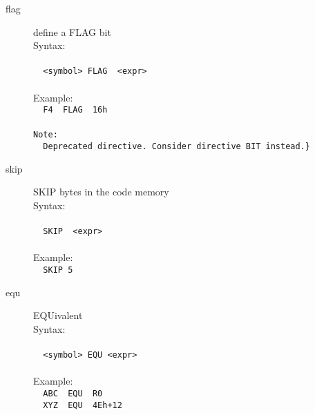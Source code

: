 \documentclass[a4paper,twoside,12pt]{book}
\begin{document}
\begin{description}
			\item[flag] define a FLAG bit\\
				Syntax:\\\\
				\verb'  '{\color{highlight_constant}\verb'<symbol>'}\verb' '{\color{highlight_directive}\verb'FLAG'}\verb'  '{\color{highlight_symbol}\verb'<'}{\color{highlight_constant}\verb'expr'}{\color{highlight_symbol}\verb'>'}\\
				\verb''\\
				Example:\\
				\verb'  '{\color{highlight_constant}\verb'F4'}\verb'  '{\color{highlight_directive}\verb'FLAG'}\verb'  '{\color{highlight_hex}\verb'16h'}\\
				\verb''\\
				{\color{highlight_label}\verb'Note:'}\\
				\verb'  '{\color{highlight_macro}\verb'Deprecated'}\verb' '{\color{highlight_constant}\verb'directive. Consider directive BIT instead.}'}\\
			\item[skip] SKIP bytes in the code memory\\
				Syntax:\\\\
				\verb'  '{\color{highlight_directive}\verb'SKIP'}\verb'  '{\color{highlight_symbol}\verb'<'}{\color{highlight_constant}\verb'expr'}{\color{highlight_symbol}\verb'>'}\\
				\verb''\\
				Example:\\
				\verb'  '{\color{highlight_directive}\verb'SKIP'}\verb' '{\color{highlight_unknown_base}\verb'5'}\\
			\item[equ] EQUivalent\\
				Syntax:\\\\
				\verb'  '{\color{highlight_constant}\verb'<symbol>'}\verb' '{\color{highlight_directive}\verb'EQU'}\verb' '{\color{highlight_symbol}\verb'<'}{\color{highlight_constant}\verb'expr'}{\color{highlight_symbol}\verb'>'}\\
				\verb''\\
				Example:\\
				\verb'  '{\color{highlight_constant}\verb'ABC'}\verb'  '{\color{highlight_directive}\verb'EQU'}\verb'  '{\color{highlight_sfr}\verb'R0'}\\
				\verb'  '{\color{highlight_constant}\verb'XYZ'}\verb'  '{\color{highlight_directive}\verb'EQU'}\verb'  '{\color{highlight_hex}\verb'4Eh'}{\color{highlight_symbol}\verb'+'}{\color{highlight_unknown_base}\verb'12'}\\

\end{description}
\end{document}
